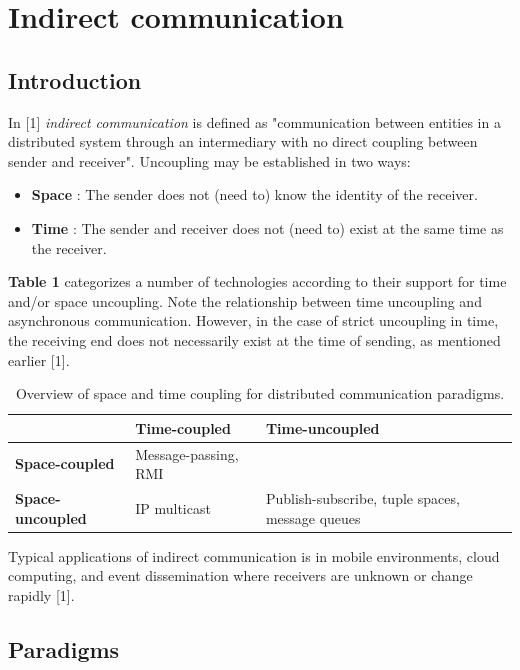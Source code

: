 \chapter{Indirect communication}


\section{Introduction}

In [1] \emph{indirect communication} is defined as "communication between entities in a distributed system through an intermediary with no direct coupling between sender and receiver". Uncoupling may be established in two ways:

\begin{itemize}
	\item \textbf{Space} : The sender does not (need to) know the identity of the receiver.
	\item \textbf{Time} : The sender and receiver does not (need to) exist at the same time as the receiver.
\end{itemize}

\textbf{Table 1} categorizes a number of technologies according to their support for time and/or space uncoupling. Note the relationship between time uncoupling and asynchronous communication. However, in the case of strict uncoupling in time, the receiving end does not necessarily exist at the time of sending, as mentioned earlier [1].


\begin{table}
	\caption{Overview of space and time coupling for distributed communication paradigms.}
	\label{tab:}
	\begin{tabular}{p{100px} | p{125px} | p{125px}}
															& \textbf{Time-coupled} 	& \textbf{Time-uncoupled} \\
		\hline
		\textbf{Space-coupled} 		& Message-passing, RMI 		&  \\
		\textbf{Space-uncoupled} 	& IP multicast						& Publish-subscribe, tuple spaces, message queues \\
		\hline
	\end{tabular}
\end{table}

Typical applications of indirect communication is in mobile environments, cloud computing, and event dissemination where receivers are unknown or change rapidly [1].



\section{Paradigms}

